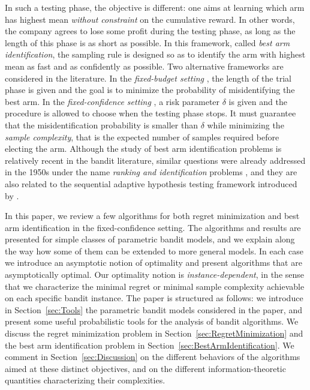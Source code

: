 \documentclass[proc]{edpsmath}
\begin{document}
	In such a testing phase, the objective is different: one aims at learning which arm has highest mean \emph{without constraint} on the cumulative reward. In other words, the company agrees to lose some profit during the testing phase, as long as the length of this phase is as short as possible. In this framework, called \emph{best arm identification}, the sampling rule is designed so as to identify the arm with highest mean as fast and as confidently as possible. Two alternative frameworks are considered in the literature. In the \emph{fixed-budget setting} \cite{Bubeck10BestArm}, the length of the trial phase is given and the goal is to minimize the probability of misidentifying the best arm. In the \emph{fixed-confidence setting} \cite{EvenDaral06}, a risk parameter $\delta$ is given and the procedure is allowed to choose when the testing phase stops. It must guarantee that the misidentification probability is smaller than $\delta$ while minimizing the \emph{sample complexity}, that is the  expected number of samples required before electing the arm. Although the study of best arm identification problems is relatively recent in the bandit literature, similar questions were already addressed in the 1950s under the name \emph{ranking and identification} problems \cite{Bechofer:54,Bechofer:al68}, and they are also related to the sequential adaptive hypothesis testing framework introduced by \cite{Chernoff59}.   
	
	In this paper, we review a few algorithms for both regret minimization and best arm identification in the fixed-confidence setting. The algorithms and results are presented for simple classes of parametric bandit models, and we explain along the way how some of them can be extended to more general models. In each case we introduce an asymptotic notion of optimality and present algorithms that are asymptotically optimal. Our optimality notion is \emph{instance-dependent}, in the sense that we characterize the minimal regret or minimal sample complexity achievable on each specific bandit instance. The paper is structured as follows: we introduce in Section~\ref{sec:Tools} the parametric bandit models considered in the paper, and present some useful probabilistic tools for the analysis of bandit algorithms. We discuss the regret minimization problem in Section~\ref{sec:RegretMinimization} and the best arm identification problem in Section~\ref{sec:BestArmIdentification}. We comment in Section~\ref{sec:Discussion} on the different behaviors of the algorithms aimed at these distinct objectives, and on the different information-theoretic quantities characterizing their complexities.
	
\end{document}
